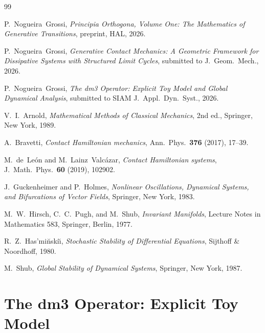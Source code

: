 \documentclass[12pt, oneside]{book}
\theoremstyle{plain}
\theoremstyle{definition}
\theoremstyle{remark}
\begin{document}
\begin{thebibliography}{99}

P.~Nogueira~Grossi,
\emph{Principia Orthogona, Volume One: The Mathematics of
  Generative Transitions},
preprint, HAL, 2026.

P.~Nogueira~Grossi,
\emph{Generative Contact Mechanics: A Geometric Framework for
  Dissipative Systems with Structured Limit Cycles},
submitted to J.\ Geom.\ Mech., 2026.

P.~Nogueira~Grossi,
\emph{The dm3 Operator: Explicit Toy Model and Global Dynamical
  Analysis},
submitted to SIAM J.\ Appl.\ Dyn.\ Syst., 2026.

V.~I.~Arnold,
\emph{Mathematical Methods of Classical Mechanics},
2nd ed., Springer, New York, 1989.

A.~Bravetti,
\emph{Contact Hamiltonian mechanics},
Ann.\ Phys.\ \textbf{376} (2017), 17--39.

M.~de~Le{\'o}n and M.~Lainz~Valc{\'a}zar,
\emph{Contact Hamiltonian systems},
J.\ Math.\ Phys.\ \textbf{60} (2019), 102902.

J.~Guckenheimer and P.~Holmes,
\emph{Nonlinear Oscillations, Dynamical Systems, and Bifurcations
  of Vector Fields},
Springer, New York, 1983.

M.~W.~Hirsch, C.~C.~Pugh, and M.~Shub,
\emph{Invariant Manifolds},
Lecture Notes in Mathematics 583, Springer, Berlin, 1977.

R.~Z.~Has{'}mi{\u{n}}ski{\u{\i}},
\emph{Stochastic Stability of Differential Equations},
Sijthoff \& Noordhoff, 1980.

M.~Shub,
\emph{Global Stability of Dynamical Systems},
Springer, New York, 1987.

\end{thebibliography}
\cleardoublepage


\part{The dm3 Operator: Explicit Toy Model}


\end{document}
